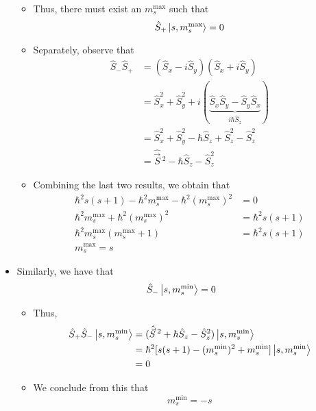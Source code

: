 \documentclass[../notes.tex]{subfiles}
\begin{document}
\begin{itemize}
\begin{itemize}
        \item Thus, there must exist an $m_s^\text{max}$ such that
        \begin{equation*}
            \hat{S}_+\ket{s,m_s^\text{max}} = 0
        \end{equation*}
        \item Separately, observe that
        \begin{align*}
            \hat{S}_-\hat{S}_+ &= (\hat{S}_x-i\hat{S}_y)(\hat{S}_x+i\hat{S}_y)\\
            &= \hat{S}_x^2+\hat{S}_y^2+i(\underbrace{\hat{S}_x\hat{S}_y-\hat{S}_y\hat{S}_x}_{i\hbar\hat{S}_z})\\
            &= \hat{S}_x^2+\hat{S}_y^2-\hbar\hat{S}_z+\hat{S}_z^2-\hat{S}_z^2\\
            &= \hat{\vec{S}}{\,}^2-\hbar\hat{S}_z-\hat{S}_z^2
        \end{align*}
        \item Combining the last two results, we obtain that
        \begin{align*}
            \hbar^2s(s+1)-\hbar^2m_s^\text{max}-\hbar^2(m_s^\text{max})^2 &= 0\\
            \hbar^2m_s^\text{max}+\hbar^2(m_s^\text{max})^2 &= \hbar^2s(s+1)\\
            \hbar^2m_s^\text{max}(m_s^\text{max}+1) &= \hbar^2s(s+1)\\
            m_s^\text{max} = s
        \end{align*}
    \end{itemize}
    \item Similarly, we have that
    \begin{equation*}
        \hat{S}_-\ket{s,m_s^\text{min}} = 0
    \end{equation*}
    \begin{itemize}
        \item Thus,
        \begin{align*}
            \hat{S}_+\hat{S}_-\ket{s,m_s^\text{min}} &= (\hat{\vec{S}}{\,}^2+\hbar\hat{S}_z-\hat{S}_z^2)\ket{s,m_s^\text{min}}\\
            &= \hbar^2[s(s+1)-(m_s^\text{min})^2+m_s^\text{min}]\ket{s,m_s^\text{min}}\\
            &= 0
        \end{align*}
        \item We conclude from this that
        \begin{equation*}
            m_s^\text{min} = -s
        \end{equation*}

\end{itemize}
\end{itemize}
\end{document}
